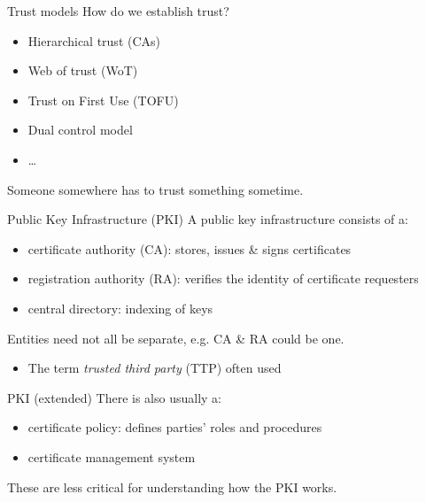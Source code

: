 \begin{frame}{Trust models}
  How do we establish trust?
  \begin{itemize}[<+(1)->]
    \item Hierarchical trust (CAs)
    \item Web of trust (WoT)
    \item Trust on First Use (TOFU)
    \item Dual control model
    \item \dots
  \end{itemize}

  \pause
  Someone somewhere has to trust something sometime.
\end{frame}

\begin{frame}{Public Key Infrastructure (PKI)}
  A public key infrastructure consists of a:
  \begin{itemize}[<+(1)->]
    \item certificate authority (CA): stores, issues \& signs certificates
    \item registration authority (RA): verifies the identity of certificate requesters
    \item central directory: indexing of keys
  \end{itemize}

  \pause
  Entities need not all be separate, e.g. CA \& RA could be one.
  \begin{itemize}
    \item The term \emph{trusted third party} (TTP) often used
  \end{itemize}
\end{frame}

\begin{frame}{PKI (extended)}
  \pause
  There is also usually a:
  \begin{itemize}[<+(1)->]
    \item certificate policy: defines parties' roles and procedures
    \item certificate management system
  \end{itemize}

  \pause
  These are less critical for understanding how the PKI works.
\end{frame}

